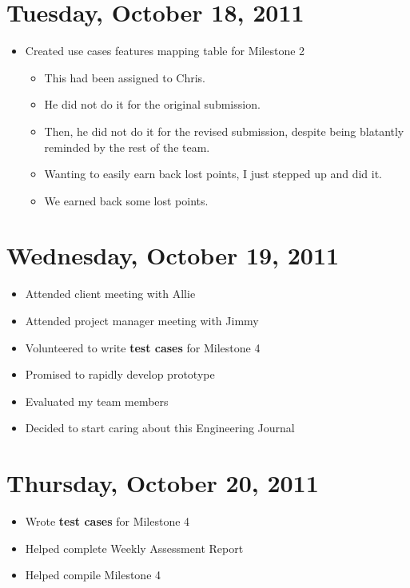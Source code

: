 \documentclass{article}
\begin{document}
\section{Tuesday, October 18, 2011}
\begin{itemize}
\item Created use cases features mapping table for Milestone 2
    \begin{itemize}
    \item This had been assigned to Chris.
    \item He did not do it for the original submission.
    \item Then, he did not do it for the revised submission, despite being blatantly reminded by the rest of the team.
    \item Wanting to easily earn back lost points, I just stepped up and did it.
    \item We earned back some lost points.
    \end{itemize}
\end{itemize}

\section{Wednesday, October 19, 2011}
\begin{itemize}
\item Attended client meeting with Allie
\item Attended project manager meeting with Jimmy
\item Volunteered to write \textbf{test cases} for Milestone 4
\item Promised to rapidly develop prototype
\item Evaluated my team members
\item Decided to start caring about this Engineering Journal
\end{itemize}

\section{Thursday, October 20, 2011}
\begin{itemize}
\item Wrote \textbf{test cases} for Milestone 4
\item Helped complete Weekly Assessment Report
\item Helped compile Milestone 4
\end{itemize}
\end{document}
